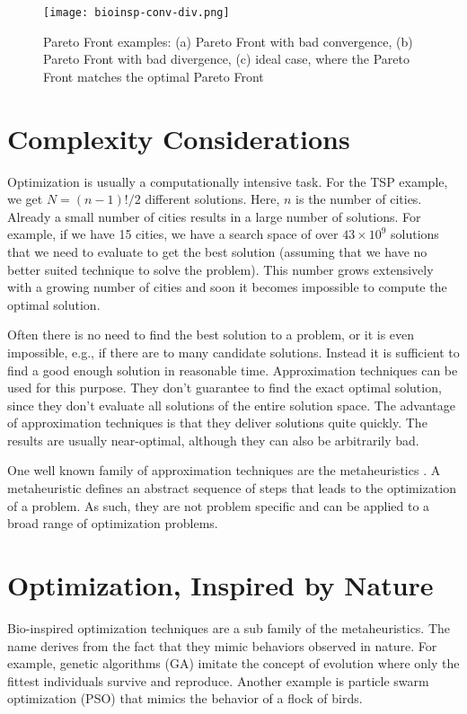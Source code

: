 \begin{figure}
  \centering
  \texttt{[image: bioinsp-conv-div.png]}
  \caption[Pareto Front examples]{Pareto Front examples: (a) Pareto Front with bad convergence, (b) Pareto Front with bad divergence, (c) ideal case, where the Pareto Front matches the optimal Pareto Front}
  \label{fig:conv-div}
\end{figure}

\section{Complexity Considerations}
Optimization is usually a computationally intensive task. For the TSP example, we get $N=(n-1)!/2$ different solutions. Here, $n$ is the number of cities. Already a small number of cities results in a large number of solutions. For example, if we have 15 cities, we have a search space of over $43 \times 10^9$ solutions that we need to evaluate to get the best solution (assuming that we have no better suited technique to solve the problem). This number grows extensively with a growing number of cities and soon it becomes impossible to compute the optimal solution.

Often there is no need to find the best solution to a problem, or it is even impossible, e.g., if there are to many candidate solutions. Instead it is sufficient to find a good enough solution in reasonable time. Approximation techniques can be used for this purpose. They don't guarantee to find the exact optimal solution, since they don't evaluate all solutions of the entire solution space. The advantage of approximation techniques is that they deliver solutions quite quickly. The results are usually near-optimal, although they can also be arbitrarily bad.

One well known family of approximation techniques are the metaheuristics \cite{yang2010nature}. A metaheuristic defines an abstract sequence of steps that leads to the optimization of a problem. As such, they are not problem specific and can be applied to a broad range of optimization problems.

\section{Optimization, Inspired by Nature}
Bio-inspired optimization techniques are a sub family of the metaheuristics. The name derives from the fact that they mimic behaviors observed in nature. For example, genetic algorithms (GA) \cite{sivanandam2008genetic} imitate the concept of evolution where only the fittest individuals survive and reproduce. Another example is particle swarm optimization (PSO) \cite{kennedy2010particle} that mimics the behavior of a flock of birds.


